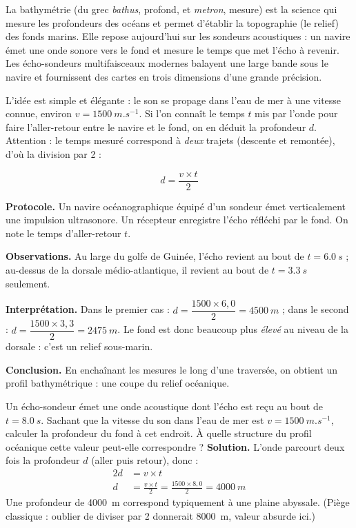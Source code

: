 \documentclass[11pt]{article}
\newcommand{\cle}[1]{{\popxbold\color{popdark}#1}}
\newcounter{popsec}
\newcounter{popsub}
\newcommand{\courssub}[1]{%
  \stepcounter{popsub}%
  \par\vspace{9pt}\noindent{\popxbold\fontsize{11.5}{13}\selectfont\color{popink}{\color{poporange}\thepopsec.\thepopsub}\hspace{6pt}#1}\par\nopagebreak\vspace{4pt}
}
\begin{document}
\begin{definition}[Bathymétrie]
La \cle{bathymétrie} (du grec \emph{bathus}, profond, et \emph{metron}, mesure) est la science qui mesure les profondeurs des océans et permet d'établir la topographie (le relief) des fonds marins. Elle repose aujourd'hui sur les \cle{sondeurs acoustiques} : un navire émet une onde sonore vers le fond et mesure le temps que met l'écho à revenir. Les \cle{écho-sondeurs multifaisceaux} modernes balayent une large bande sous le navire et fournissent des cartes en trois dimensions d'une grande précision.
\end{definition}

\courssub{Le principe de la mesure bathymétrique}

L'idée est simple et élégante : le son se propage dans l'eau de mer à une vitesse connue, environ $v = \SI{1500}{m.s^{-1}}$. Si l'on connaît le temps $t$ mis par l'onde pour faire l'aller-retour entre le navire et le fond, on en déduit la profondeur $d$. Attention : le temps mesuré correspond à \emph{deux} trajets (descente et remontée), d'où la division par 2 :

\[ d = \frac{v \times t}{2} \]

\begin{experience}
\textbf{Protocole.} Un navire océanographique équipé d'un sondeur émet verticalement une impulsion ultrasonore. Un récepteur enregistre l'écho réfléchi par le fond. On note le temps d'aller-retour $t$.\par
\textbf{Observations.} Au large du golfe de Guinée, l'écho revient au bout de $t = \SI{6,0}{s}$ ; au-dessus de la dorsale médio-atlantique, il revient au bout de $t = \SI{3,3}{s}$ seulement.\par
\textbf{Interprétation.} Dans le premier cas : $d = \dfrac{1500 \times 6{,}0}{2} = \SI{4500}{m}$ ; dans le second : $d = \dfrac{1500 \times 3{,}3}{2} = \SI{2475}{m}$. Le fond est donc beaucoup plus \emph{élevé} au niveau de la dorsale : c'est un relief sous-marin.\par
\textbf{Conclusion.} En enchaînant les mesures le long d'une traversée, on obtient un \cle{profil bathymétrique} : une coupe du relief océanique.
\end{experience}

\begin{exoresolu}
Un écho-sondeur émet une onde acoustique dont l'écho est reçu au bout de $t = \SI{8,0}{s}$. Sachant que la vitesse du son dans l'eau de mer est $v = \SI{1500}{m.s^{-1}}$, calculer la profondeur du fond à cet endroit. À quelle structure du profil océanique cette valeur peut-elle correspondre ?
\tcblower
\textbf{Solution.} L'onde parcourt deux fois la profondeur $d$ (aller puis retour), donc :
\begin{align*}
2d &= v \times t \\
d &= \frac{v \times t}{2} = \frac{1500 \times 8{,}0}{2} = \SI{4000}{m}
\end{align*}
Une profondeur de \SI{4000}{m} correspond typiquement à une \cle{plaine abyssale}. (Piège classique : oublier de diviser par 2 donnerait \SI{8000}{m}, valeur absurde ici.)
\end{exoresolu}
\end{document}

